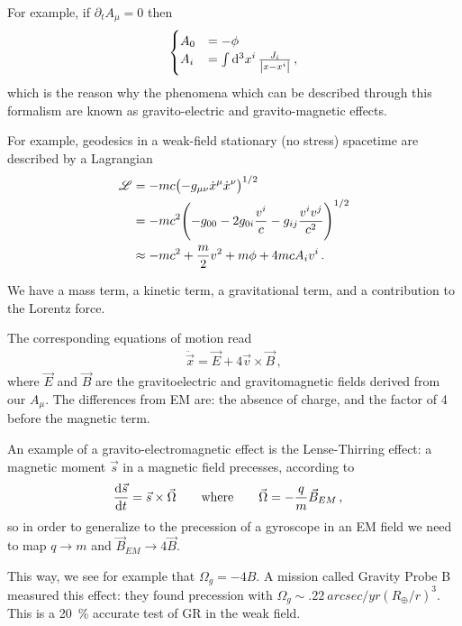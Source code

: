 \documentclass[main.tex]{subfiles}
\begin{document}
For example, if \(\partial_{t} A_{\mu } = 0\) then 
%
\begin{align}
\begin{cases}
    A_0 &= - \phi  \\
    A_{i} &= \int \dd[3]{x^{i}} \frac{J_i}{\abs{x - x^{i}}}
\,,
\end{cases}
\end{align}
%
which is the reason why the phenomena which can be described through this formalism are known as gravito-electric and gravito-magnetic effects. 

\begin{claim}
For example, geodesics in a weak-field stationary (no stress) spacetime are described by a Lagrangian 
%
\begin{align}
\mathscr{L} &= - mc \qty(- g_{\mu \nu } \dot{x}^{\mu } \dot{x}^{\nu })^{1/2}  \\
&= - mc^2 \qty(- g_{00} - 2 g_{0i} \frac{v^{i}}{c} - g_{ij} \frac{v^{i} v^{j}}{c^2})^{1/2}  \\
&\approx -mc^2 + \frac{m}{2} v^2 + m \phi + 4 mc A_{i}v^{i}
\,.
\end{align}
\end{claim}

We have a mass term, a kinetic term, a gravitational term, and a contribution to the Lorentz force. 

The corresponding equations of motion read 
%
\begin{align}
\ddot{\vec{x}} = \vec{E} + 4 \vec{v} \times \vec{B}
\,,
\end{align}
%
where \(\vec{E}\) and \(\vec{B}\) are the gravitoelectric and gravitomagnetic fields derived from our \(A_{\mu }\). 
The differences from EM are: the absence of charge, and the factor of 4 before the magnetic term.

An example of a gravito-electromagnetic effect is the Lense-Thirring effect: a magnetic moment \(\vec{s}\) in a magnetic field precesses, according to 
%
\begin{align}
\dv{\vec{s}}{t} &= \vec{s} \times \vec{\Omega}
\qquad \text{where} \qquad
\vec{\Omega} = - \frac{q}{m} \vec{B}_{EM}
\,,
\end{align}
%
so in order to generalize to the precession of a gyroscope in an EM field we need to map \(q \to m\) and \(\vec{B}_{EM} \to 4 \vec{B}\). 

This way, we see for example that \(\Omega _g = - 4 B\). 
A mission called Gravity Probe B measured this effect: they found precession with \(\Omega _g \sim \SI{.22}{arcsec / yr} (R_{\oplus} / r)^3\). 
This is a \SI{20}{\percent} accurate test of GR in the weak field. 
\end{document}
